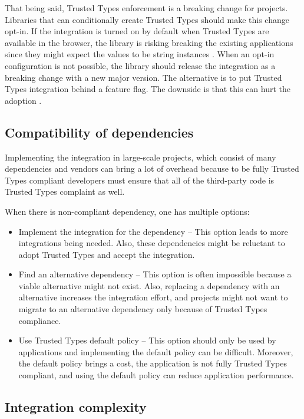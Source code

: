 That being said, Trusted Types enforcement is a breaking change for projects. Libraries that can
conditionally create Trusted Types should make this change opt-in. If the integration is turned on
by default when Trusted Types are available in the browser, the library is risking breaking the
existing applications since they might expect the values to be string instances
\cite{dom_purify_breakage}. When an opt-in configuration is not possible, the library should release
the integration as a breaking change with a new major version. The alternative is to put Trusted
Types integration behind a feature flag. The downside is that this can hurt the adoption
\cite{react_tt_feature_flag}.

\subsection{Compatibility of dependencies}
\label{sub:tt_compatibility_in_deps}

Implementing the integration in large-scale projects, which consist of many dependencies and vendors
can bring a lot of overhead because to be fully Trusted Types compliant developers must ensure that
all of the third-party code is Trusted Types complaint as well.

When there is non-compliant dependency, one has multiple options:

\begin{itemize}
  \item Implement the integration for the dependency -- This option leads to more integrations being
        needed. Also, these dependencies might be reluctant to adopt Trusted Types and accept the
        integration.
  \item Find an alternative dependency -- This option is often impossible because a viable
        alternative might not exist. Also, replacing a dependency with an alternative increases the
        integration effort, and projects might not want to migrate to an alternative dependency only
        because of Trusted Types compliance.
  \item Use Trusted Types default policy -- This option should only be used by applications and
        implementing the default policy can be difficult. Moreover, the default policy brings a
        cost, the application is not fully Trusted Types compliant, and using the default policy can
        reduce application performance.
\end{itemize}

\subsection{Integration complexity}
\label{sub:trust_integration_author}


